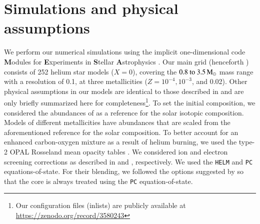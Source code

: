 \documentclass[main.tex]{subfiles}
\begin{document}

\section{Simulations and physical assumptions} \label{sec:methods}

We perform our numerical simulations using the implicit 
one-dimensional code \textbf{M}odules 
for \textbf{E}xperiments in \textbf{S}tellar 
\textbf{A}strophysics \citep[\mesa\,v10398;][]{Paxton:2010ji,Paxton:2013pj,Paxton:2015jva,Paxton:2017eie}. Our main grid (henceforth \seriesone) consists of 252 
helium star models ($X=0$), covering the $\numrange{0.8}{3.5}\msun$  mass 
range with a resolution of 0.1\msun, at three metallicities 
($Z = 10^{-4}, 10^{-3}$, and 0.02).
Other physical assumptions in our models  are identical to those described in  and are 
only briefly summarized here for completeness\footnote{Our \mesa configuration 
files (inlists) are publicly available at \url{https://zenodo.org/record/3580243}}.
To set the initial composition, we considered the  abundances of \cite{grevesse1998} as a reference for the solar isotopic composition. Models of different metallicities have abundances that are scaled from the aforementioned reference for the solar composition. To better account for an enhanced carbon-oxygen mixture as a result of helium burning, we used the type-2 OPAL Rosseland mean opacity tables \citep{OPAL}. 
 We considered ion and electron screening corrections as described in \cite{PCR2009} and \cite{Itoh2002},  respectively.
We used the  \texttt{HELM} \citep{HELM:eos} and \texttt{PC} \citep{PC:eos} equations-of-state. For their blending,  we followed the options suggested by \cite{Schwab:2017epw} so that the core is always treated using the \texttt{PC}  equation-of-state.
\end{document}
